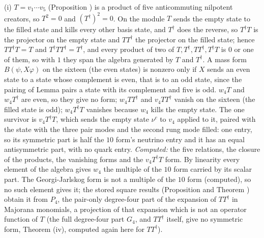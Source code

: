 (i) $T = v_{1}\cdots v_{5}$ (Proposition ) is a product of five anticommuting nilpotent creators, so $T^{2} = 0$ and $(T^{\dagger})^{2} = 0$. On the module $T$ sends the empty state to the filled state and kills every other basis state, and $T^{\dagger}$ does the reverse, so $T^{\dagger}T$ is the projector on the empty state and $TT^{\dagger}$ the projector on the filled state; hence $TT^{\dagger}T = T$ and $T^{\dagger}TT^{\dagger} = T^{\dagger}$, and every product of two of $T, T^{\dagger}, TT^{\dagger}, T^{\dagger}T$ is $0$ or one of them, so with $1$ they span the algebra generated by $T$ and $T^{\dagger}$. A mass form $B(\psi, X\varphi)$ on the sixteen (the even states) is nonzero only if $X$ sends an even state to a state whose complement is even, that is to an odd state, since the pairing of Lemma  pairs a state with its complement and five is odd. $w_{4}T$ and $w_{4}T^{\dagger}$ are even, so they give no form; $w_{4}TT^{\dagger}$ and $v_{4}TT^{\dagger}$ vanish on the sixteen (the filled state is odd); $w_{4}T^{\dagger}T$ vanishes because $w_{4}$ kills the empty state. The one survivor is $v_{4}T^{\dagger}T$, which sends the empty state $\nu^{c}$ to $v_{4}$ applied to it, paired with the state with the three pair modes and the second rung mode filled: one entry, so its symmetric part is half the $10$ form's neutrino entry and it has an equal antisymmetric part, with no quark entry. \emph{Computed:} the five relations, the closure of the products, the vanishing forms and the $v_{4}T^{\dagger}T$ form. By linearity every element of the algebra gives $w_{4}$ the multiple of the $10$ form carried by its scalar part. The Georgi-Jarlskog form is not a multiple of the $10$ form (computed), so no such element gives it; the stored square results (Proposition  and Theorem ) obtain it from $P_{4}$, the pair-only degree-four part of the expansion of $TT^{\dagger}$ in Majorana monomials, a projection of that expansion which is not an operator function of $T$ (the full degree-four part $G_{4}$, and $TT^{\dagger}$ itself, give no symmetric form, Theorem (iv), computed again here for $TT^{\dagger}$).

